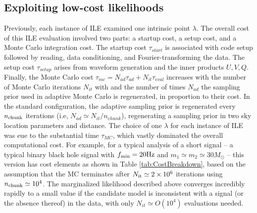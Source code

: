 \documentclass[twocolumn,prd,nofootinbib]{revtex4}
\newcommand\unit[1]{{\rm #1}}
\begin{document}
\subsection{Exploiting low-cost likelihoods}
Previously, each instance of ILE examined one intrinsic point $\lambda$.  The overall cost of this ILE evaluation
involved two parts: a startup cost, a setup cost, and a Monte Carlo integration cost.  The  startup cost $\tau_{start}$
is associated with code setup followed by reading, data conditioning, and Fourier-transforming the
data.  The setup cost $\tau_{setup}$ arises from waveform generation and  the inner products $U,V,Q$.  Finally, the Monte Carlo
cost $\tau_{mc}=N_{ad} \tau_{ad}+N_{it}\tau_{eval}$ increases with the number of Monte Carlo iterations $N_{it}$ with
and the number of times $N_{ad}$ the sampling prior used in adaptive Monte Carlo is regenerated, in proportion to their
cost.   In the standard configuration, the adaptive sampling prior is regenerated every $n_{\rm chunk}$ iterations (i.e,
 $N_{ad} \simeq N_{it}/n_{chunk}$), regenerating a sampling prior in two sky location parameters and distance.  
The choice of one $\lambda$ for each instance of ILE was eue to the substantial time  $\tau_{MC}$, which vastly
dominated the overall computational cost.   For example, for a typical analysis of a short signal --  a typical binary
black hole signal with $f_{\rm min}=20 \unit{Hz}$ and $m_1\simeq m_2\simeq 30 M_\odot$ --  this version has
cost elements as shown in Table \ref{tab:CostBreakdown}, based on the assumption that the MC terminates after $N_{\rm it}\simeq 2\times 10^6$ iterations using
$n_{\rm chunk}\simeq 10^4$.  
The marginalized likelihood described above  converges incredibly rapidly to a small value if the candidate model is
inconsistent with a signal (or the absence thereof) in the data, with only $N_{it} \simeq O(10^4)$  evaluations needed.
\end{document}
